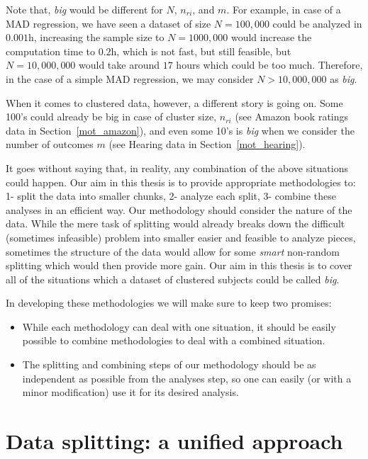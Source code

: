 \documentclass[11pt,a5paper,twoside]{book}
\begin{document}
Note that, \emph{big} would be different for $N$, $n_{ri}$, and $m$. For example, in case of a MAD regression, we have seen a dataset of size $N=100,000$ could be analyzed in $0.001$h, increasing the sample size to $N = 1000,000$ would increase the computation time to $0.2$h, which is not fast, but still feasible, but $N=10,000,000$ would take around $17$ hours which could be too much. Therefore, in the case of a simple MAD regression, we may consider $N>10,000,000$ as \emph{big}.

When it comes to clustered data, however, a different story is going on. Some 100's could already be big in case of cluster size, $n_{ri}$ (see Amazon book ratings data in Section~\ref{mot_amazon}), and even some 10's is \emph{big} when we consider the number of outcomes $m$ (see Hearing data in Section~\ref{mot_hearing}).

It goes without saying that, in reality, any combination of the above situations could happen. Our aim in this thesis is to provide appropriate methodologies to: 1- split the data into smaller chunks, 2- analyze each split, 3- combine these analyses in an efficient way. Our methodology should consider the nature of the data. While the mere task of splitting would already breaks down the difficult (sometimes infeasible) problem into smaller easier and feasible to analyze pieces, sometimes the structure of the data would allow for some \emph{smart} non-random splitting which would then provide more gain. Our aim in this thesis is to cover all of the situations which a dataset of clustered subjects could be called \emph{big}. 

In developing these methodologies we will make sure to keep two promises:

\begin{itemize}
\item While each methodology can deal with one situation, it should be easily possible to combine methodologies to deal with a combined situation.

\item The splitting and combining steps of our methodology should be as independent as possible from the analyses step, so one can easily (or with a minor modification) use it for its desired analysis.
 
\end{itemize}

\section{Data splitting: a unified approach}
\end{document}
